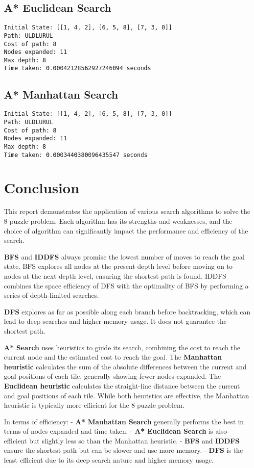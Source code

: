 \documentclass{article}
\begin{document}
\subsection{A* Euclidean Search}
\begin{verbatim}
Initial State: [[1, 4, 2], [6, 5, 8], [7, 3, 0]]
Path: ULDLURUL
Cost of path: 8
Nodes expanded: 11
Max depth: 8
Time taken: 0.00042128562927246094 seconds
\end{verbatim}

\clearpage

\subsection{A* Manhattan Search}
\begin{verbatim}
Initial State: [[1, 4, 2], [6, 5, 8], [7, 3, 0]]
Path: ULDLURUL
Cost of path: 8
Nodes expanded: 11
Max depth: 8
Time taken: 0.0003440380096435547 seconds
\end{verbatim}

\clearpage

\section{Conclusion}
This report demonstrates the application of various search algorithms to solve the 8-puzzle problem. Each algorithm has its strengths and weaknesses, and the choice of algorithm can significantly impact the performance and efficiency of the search.

\textbf{BFS} and \textbf{IDDFS} always promise the lowest number of moves to reach the goal state. BFS explores all nodes at the present depth level before moving on to nodes at the next depth level, ensuring the shortest path is found. IDDFS combines the space efficiency of DFS with the optimality of BFS by performing a series of depth-limited searches.

\textbf{DFS} explores as far as possible along each branch before backtracking, which can lead to deep searches and higher memory usage. It does not guarantee the shortest path.

\textbf{A* Search} uses heuristics to guide its search, combining the cost to reach the current node and the estimated cost to reach the goal. The \textbf{Manhattan heuristic} calculates the sum of the absolute differences between the current and goal positions of each tile, generally showing fewer nodes expanded. The \textbf{Euclidean heuristic} calculates the straight-line distance between the current and goal positions of each tile. While both heuristics are effective, the Manhattan heuristic is typically more efficient for the 8-puzzle problem.

In terms of efficiency:
- \textbf{A* Manhattan Search} generally performs the best in terms of nodes expanded and time taken.
- \textbf{A* Euclidean Search} is also efficient but slightly less so than the Manhattan heuristic.
- \textbf{BFS} and \textbf{IDDFS} ensure the shortest path but can be slower and use more memory.
- \textbf{DFS} is the least efficient due to its deep search nature and higher memory usage.
\end{document}
